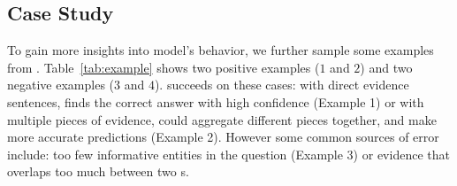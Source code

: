 \subsection{Case Study}

To gain more insights into \name{} model's behavior, we further sample
some examples from \qblink{}.  Table~\ref{tab:example} shows two
positive examples ($1$ and $2$) and two negative examples ($3$ and
$4$).  \name{} succeeds on these cases: with direct evidence
sentences, \name{} finds the correct answer with high confidence
(Example 1) or with multiple pieces of evidence, \name{} could
aggregate different pieces together, and make more accurate
predictions (Example 2).  However some common sources of error
include: too few informative entities in the question (Example 3) or
evidence that overlaps too much between two \rightnode{}s.







